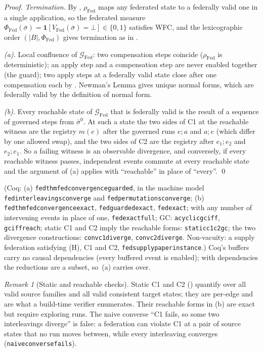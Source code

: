 \documentclass[11pt,a4paper]{article}
\theoremstyle{plain}
\theoremstyle{definition}
\theoremstyle{remark}
\newtheorem{remark}[theorem]{Remark}
\newcommand{\Fed}{\mathrm{Fed}}
\renewcommand{\_}{\textunderscore\allowbreak}
\begin{document}
\begin{proof}
\emph{Termination.}  By , $\rho_\Fed$ maps any
federated state to a federally valid one in a single application, so the
federated measure $\Phi_\Fed(\bar{\sigma}) = \mathbf{1}[V_\Fed(\bar{\sigma}) =
\bot] \in \{0, 1\}$ satisfies WFC, and the lexicographic order $(|B|,
\Phi_\Fed)$ gives termination as in .

\emph{(a).}  Local confluence of $\mathcal{G}_\Fed$: two compensation steps
coincide ($\rho_\Fed$ is deterministic); an apply step and a compensation step
are never enabled together (the guard); two apply steps at a federally valid
state close after one compensation each by .  Newman's Lemma
gives unique normal forms, which are federally valid by the definition of
normal form.

\emph{(b).}  Every reachable state of $\mathcal{G}_\Fed$ that is federally valid
is the result of a sequence of governed steps from $\bar{\sigma}^0$.  At such a
state the two sides of C1 at the reachable witness are the registry $m(e)$ after
the governed runs $e;a$ and $a;e$ (which differ by one allowed swap), and the
two sides of C2 are the registry after $e_1;e_2$ and $e_2;e_1$.  So a failing
witness is an observable divergence, and conversely, if every reachable witness
passes, independent events commute at every reachable state and the argument of
(a) applies with ``reachable'' in place of ``every''. \qed
\end{proof}

(Coq: (a) \texttt{fed\_thm\_fed\_convergence\_guarded}, in the machine model
\texttt{fed\_interleavings\_converge} and \texttt{fed\_permutations\_converge};
(b) \texttt{fed\_thm\_fed\_convergence\_exact}, \texttt{fed\_guarded\_exact},
\texttt{fed\_exact}; with any number of intervening events in place of one,
\texttt{fed\_exact\_full}; GC: \texttt{acyclic\_gc\_iff},
\texttt{gc\_iff\_reach}; static C1 and C2 imply the reachable forms:
\texttt{static\_c1\_c2\_gc}; the two divergence constructions:
\texttt{conv\_c1\_diverge}, \texttt{conv\_c2\_diverge}.  Non-vacuity: a supply
federation satisfying (H), C1 and C2, \texttt{fed\_supply\_paper\_instance}.)
Coq's buffers carry no causal dependencies (every buffered event is enabled);
with dependencies the reductions are a subset, so~(a) carries over.

\begin{remark}[Static and reachable checks]
\label{rem:static-reachable}
Static C1 and C2 () quantify over all valid source families and
all valid consistent target states; they are per-edge and are what a build-time
verifier enumerates.  Their reachable forms in (b)
are exact but require exploring runs.  The naive converse ``C1 fails, so some
two interleavings diverge'' is false: a federation can violate C1 at a pair of
source states that no run moves between, while every interleaving converges
(\texttt{naive\_converse\_fails}).
\end{remark}
\end{document}
